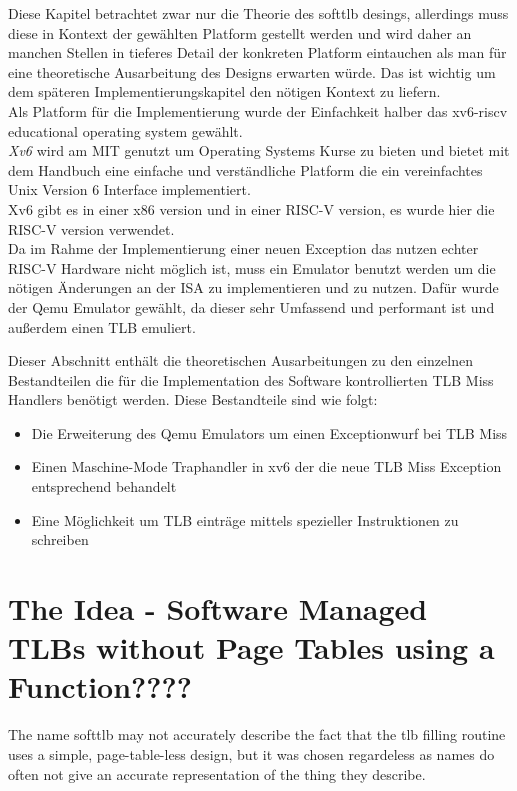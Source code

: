 Diese Kapitel betrachtet zwar nur die Theorie des softtlb desings, allerdings muss diese in Kontext
der gewählten Platform gestellt werden und wird daher an manchen Stellen in tieferes Detail der konkreten
Platform eintauchen als man für eine theoretische Ausarbeitung des Designs erwarten würde.
Das ist wichtig um dem späteren Implementierungskapitel den nötigen Kontext zu liefern.\\
Als Platform für die Implementierung wurde der Einfachkeit halber das xv6-riscv educational operating
system \cite{cox2011xv6} gewählt.\\
\textit{Xv6} wird am MIT genutzt um Operating Systems Kurse zu bieten und bietet mit dem Handbuch eine
einfache und verständliche Platform die ein vereinfachtes Unix Version 6 Interface implementiert.\\
Xv6 gibt es in einer x86 version und in einer RISC-V version, es wurde hier die RISC-V version verwendet.
\\
Da im Rahme der Implementierung einer neuen Exception das nutzen echter RISC-V Hardware nicht möglich
ist, muss ein Emulator benutzt werden um die nötigen Änderungen an der ISA zu implementieren und zu nutzen.
Dafür wurde der Qemu Emulator gewählt, da dieser sehr Umfassend und performant ist und außerdem einen
TLB emuliert.

Dieser Abschnitt enthält die theoretischen Ausarbeitungen zu den einzelnen Bestandteilen die für
die Implementation des Software kontrollierten TLB Miss Handlers benötigt werden. Diese Bestandteile
sind wie folgt:
\begin{itemize}
    \item Die Erweiterung des Qemu Emulators um einen Exceptionwurf bei TLB Miss
    \item Einen Maschine-Mode Traphandler in xv6 der die neue TLB Miss Exception entsprechend behandelt
    \item Eine Möglichkeit um TLB einträge mittels spezieller Instruktionen zu schreiben
\end{itemize}

\section{The Idea - Software Managed TLBs without Page Tables using a Function????}
The name softtlb may not accurately describe the fact that the tlb filling routine uses a simple,
page-table-less design, but it was chosen regardeless as names do often not give an accurate
representation of the thing they describe.
